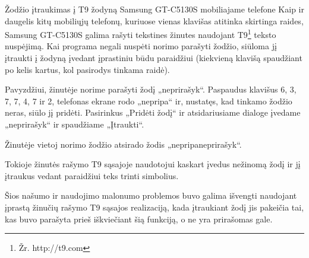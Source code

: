 \begin{xcase}{Žodžio įtraukimas į T9 žodyną Samsung GT-C5130S mobiliajame
              telefone}
  \xcgoal
  {
    Kaip ir daugelis kitų mobiliųjų telefonų, kuriuose vienas klavišas
    atitinka skirtinga raides, Samsung GT-C5130S galima rašyti tekstines
    žinutes naudojant T9\footnote{Žr. http://t9.com} teksto nuspėjimą. Kai
    programa negali nuspėti norimo parašyti žodžio, siūloma jį įtraukti į
    žodyną įvedant įprastiniu būdu paraidžiui (kiekvieną klavišą spaudžiant
    po kelis kartus, kol pasirodys tinkama raidė).
  }
  
  \xctools
  { %
    Pavyzdžiui, žinutėje norime parašyti žodį „neprirašyk“. Paspaudus
    klavišus 6, 3, 7, 7, 4, 7 ir 2, telefonas ekrane rodo „nepripa“ ir,
    nustatęs, kad tinkamo žodžio neras, siūlo jį pridėti. Pasirinkus
    „Pridėti žodį“ ir atsidariusiame dialoge įvedame „neprirašyk“ ir
    spaudžiame „Įtraukti“.
  }
  
  \xcresult
  {
    Žinutėje vietoj norimo žodžio atsirado žodis „nepripaneprirašyk“.
  }
  
  \xcprinciples
  {
    {
      Tokioje žinutės rašymo T9 sąsajoje naudotojui kaskart įvedus nežinomą
      žodį ir jį įtraukus vedant paraidžiui teks trinti simbolius.
    }
  }
  
  \xcthoughts
  {
    Šios našumo ir naudojimo malonumo problemos buvo galima išvengti
    naudojant įprastą žinučių rašymo T9 sąsajos realizaciją, kada įtraukiant
    žodį jis pakeičia tai, kas buvo parašyta prieš iškviečiant šią funkciją,
    o ne yra prirašomas gale.
  }
\end{xcase}
